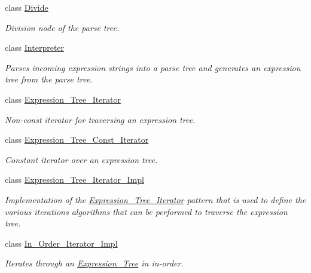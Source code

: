 \begin{DoxyCompactItemize}
class \hyperlink{classMadara_1_1Expression__Tree_1_1Divide}{Divide}
\begin{DoxyCompactList}\small\item\em Division node of the parse tree. \item\end{DoxyCompactList}\item 
class \hyperlink{classMadara_1_1Expression__Tree_1_1Interpreter}{Interpreter}
\begin{DoxyCompactList}\small\item\em Parses incoming expression strings into a parse tree and generates an expression tree from the parse tree. \item\end{DoxyCompactList}\item 
class \hyperlink{classMadara_1_1Expression__Tree_1_1Expression__Tree__Iterator}{Expression\_\-Tree\_\-Iterator}
\begin{DoxyCompactList}\small\item\em Non-\/const iterator for traversing an expression tree. \item\end{DoxyCompactList}\item 
class \hyperlink{classMadara_1_1Expression__Tree_1_1Expression__Tree__Const__Iterator}{Expression\_\-Tree\_\-Const\_\-Iterator}
\begin{DoxyCompactList}\small\item\em Constant iterator over an expression tree. \item\end{DoxyCompactList}\item 
class \hyperlink{classMadara_1_1Expression__Tree_1_1Expression__Tree__Iterator__Impl}{Expression\_\-Tree\_\-Iterator\_\-Impl}
\begin{DoxyCompactList}\small\item\em Implementation of the \hyperlink{classMadara_1_1Expression__Tree_1_1Expression__Tree__Iterator}{Expression\_\-Tree\_\-Iterator} pattern that is used to define the various iterations algorithms that can be performed to traverse the expression tree. \item\end{DoxyCompactList}\item 
class \hyperlink{classMadara_1_1Expression__Tree_1_1In__Order__Iterator__Impl}{In\_\-Order\_\-Iterator\_\-Impl}
\begin{DoxyCompactList}\small\item\em Iterates through an {\itshape \hyperlink{classMadara_1_1Expression__Tree_1_1Expression__Tree}{Expression\_\-Tree}\/} in in-\/order. \item\end{DoxyCompactList}\item 

\end{DoxyCompactItemize}
